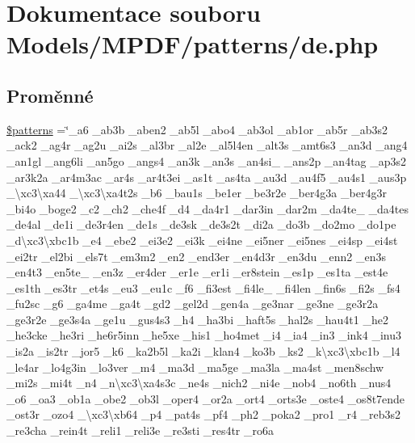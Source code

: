 \hypertarget{de_8php}{\section{Dokumentace souboru Models/\-M\-P\-D\-F/patterns/de.php}
\label{de_8php}
}
\subsection*{Proměnné}
\begin{DoxyCompactItemize}
\item 
\hyperlink{de_8php_a99c668c59ad650ca9b31ad5313dc5720}{\$patterns} =\char`\"{}\-\_\-a6 \-\_\-ab3b \-\_\-aben2 \-\_\-ab5l \-\_\-abo4 \-\_\-ab3ol \-\_\-ab1or \-\_\-ab5r \-\_\-ab3s2 \-\_\-ack2 \-\_\-ag4r \-\_\-ag2u \-\_\-ai2s \-\_\-al3br \-\_\-al2e \-\_\-al5l4en \-\_\-alt3s \-\_\-amt6s3 \-\_\-an3d \-\_\-ang4 \-\_\-an1gl \-\_\-ang6li \-\_\-an5go \-\_\-angs4 \-\_\-an3k \-\_\-an3s \-\_\-an4si\-\_\- \-\_\-ans2p \-\_\-an4tag \-\_\-ap3s2 \-\_\-ar3k2a \-\_\-ar4m3ac \-\_\-ar4s \-\_\-ar4t3ei \-\_\-as1t \-\_\-as4ta \-\_\-au3d \-\_\-au4f5 \-\_\-au4s1 \-\_\-aus3p \-\_\-\textbackslash{}xc3\textbackslash{}xa44 \-\_\-\textbackslash{}xc3\textbackslash{}xa4t2s \-\_\-b6 \-\_\-bau1s \-\_\-be1er \-\_\-be3r2e \-\_\-ber4g3a \-\_\-ber4g3r \-\_\-bi4o \-\_\-boge2 \-\_\-c2 \-\_\-ch2 \-\_\-che4f \-\_\-d4 \-\_\-da4r1 \-\_\-dar3in \-\_\-dar2m \-\_\-da4te\-\_\- \-\_\-da4tes \-\_\-de4al \-\_\-de1i \-\_\-de3r4en \-\_\-de1s \-\_\-de3sk \-\_\-de3s2t \-\_\-di2a \-\_\-do3b \-\_\-do2mo \-\_\-do1pe \-\_\-d\textbackslash{}xc3\textbackslash{}xbc1b \-\_\-e4 \-\_\-ebe2 \-\_\-ei3e2 \-\_\-ei3k \-\_\-ei4ne \-\_\-ei5ner \-\_\-ei5nes \-\_\-ei4sp \-\_\-ei4st \-\_\-ei2tr \-\_\-el2bi \-\_\-els7t \-\_\-em3m2 \-\_\-en2 \-\_\-end3er \-\_\-en4d3r \-\_\-en3du \-\_\-enn2 \-\_\-en3s \-\_\-en4t3 \-\_\-en5te\-\_\- \-\_\-en3z \-\_\-er4der \-\_\-er1e \-\_\-er1i \-\_\-er8stein \-\_\-es1p \-\_\-es1ta \-\_\-est4e \-\_\-es1th \-\_\-es3tr \-\_\-et4s \-\_\-eu3 \-\_\-eu1c \-\_\-f6 \-\_\-fi3est \-\_\-fi4le\-\_\- \-\_\-fi4len \-\_\-fin6s \-\_\-fi2s \-\_\-fs4 \-\_\-fu2sc \-\_\-g6 \-\_\-ga4me \-\_\-ga4t \-\_\-gd2 \-\_\-gel2d \-\_\-gen4a \-\_\-ge3nar \-\_\-ge3ne \-\_\-ge3r2a \-\_\-ge3r2e \-\_\-ge3s4a \-\_\-ge1u \-\_\-gus4s3 \-\_\-h4 \-\_\-ha3bi \-\_\-haft5s \-\_\-hal2s \-\_\-hau4t1 \-\_\-he2 \-\_\-he3cke \-\_\-he3ri \-\_\-he6r5inn \-\_\-he5xe \-\_\-his1 \-\_\-ho4met \-\_\-i4 \-\_\-ia4 \-\_\-in3 \-\_\-ink4 \-\_\-inu3 \-\_\-is2a \-\_\-is2tr \-\_\-jor5 \-\_\-k6 \-\_\-ka2b5l \-\_\-ka2i \-\_\-klan4 \-\_\-ko3b \-\_\-ks2 \-\_\-k\textbackslash{}xc3\textbackslash{}xbc1b \-\_\-l4 \-\_\-le4ar \-\_\-lo4g3in \-\_\-lo3ver \-\_\-m4 \-\_\-ma3d \-\_\-ma5ge \-\_\-ma3la \-\_\-ma4st \-\_\-men8schw \-\_\-mi2s \-\_\-mi4t \-\_\-n4 \-\_\-n\textbackslash{}xc3\textbackslash{}xa4s3c \-\_\-ne4s \-\_\-nich2 \-\_\-ni4e \-\_\-nob4 \-\_\-no6th \-\_\-nus4 \-\_\-o6 \-\_\-oa3 \-\_\-ob1a \-\_\-obe2 \-\_\-ob3l \-\_\-oper4 \-\_\-or2a \-\_\-ort4 \-\_\-orts3e \-\_\-oste4 \-\_\-os8t7ende \-\_\-ost3r \-\_\-ozo4 \-\_\-\textbackslash{}xc3\textbackslash{}xb64 \-\_\-p4 \-\_\-pat4s \-\_\-pf4 \-\_\-ph2 \-\_\-poka2 \-\_\-pro1 \-\_\-r4 \-\_\-reb3s2 \-\_\-re3cha \-\_\-rein4t \-\_\-reli1 \-\_\-reli3e \-\_\-re3sti \-\_\-res4tr \-\_\-ro6a 
\end{DoxyCompactItemize}

